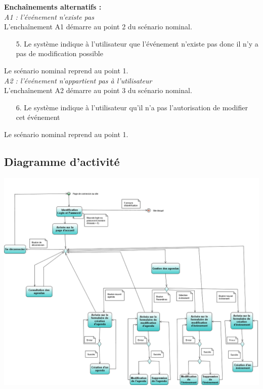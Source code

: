 \documentclass[12pt , a4paper]{article}
\begin{document}
\noindent\textbf{Encha\^inements alternatifs :}\\
\noindent\textit{A1 : l’événement n’existe pas}\\
L'encha\^inement A1 démarre au point 2 du scénario nominal.
\begin{enumerate}
\item[5.] Le système indique à l’utilisateur que l’événement n’existe pas donc il n’y a pas de modification possible
\end{enumerate}
Le scénario nominal reprend au point 1.\\


\noindent\textit{A2 : l’événement n’appartient pas à l’utilisateur}\\
L'encha\^inement A2 démarre au point 3 du scénario nominal.
\begin{enumerate}
\item[6.] Le système indique à l’utilisateur qu’il n’a pas l’autorisation de modifier cet événement
\end{enumerate}
Le scénario nominal reprend au point 1.\\

\begin{landscape}
\subsection{Diagramme d'activité}
\begin{center}
  \includegraphics[scale=0.45]{./images/diag_activite.png}
\end{center}
\end{landscape}
\end{document}
